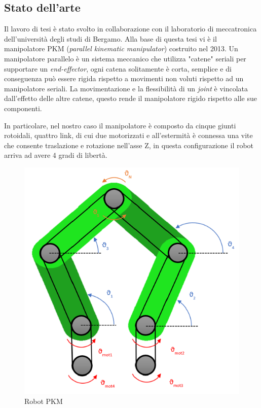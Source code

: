\subsection{Stato dell'arte}
Il lavoro di tesi è stato svolto in collaborazione con il laboratorio di meccatronica dell'università degli studi di Bergamo. Alla base di questa tesi vi è il manipolatore PKM (\textit{parallel kinematic manipulator}) costruito nel 2013. Un manipolatore parallelo è un sistema meccanico che utilizza "catene" seriali per supportare un \textit{end-effector}, ogni catena solitamente è corta, semplice e di conseguenza può essere rigida rispetto a movimenti non voluti rispetto ad un manipolatore seriali. La movimentazione e la flessibilità di un \textit{joint} è vincolata dall'effetto delle altre catene, questo rende il manipolatore rigido rispetto alle sue componenti. 
\par In particolare, nel nostro caso il manipolatore è composto da cinque giunti rotoidali, quattro link, di cui due motorizzati e all'estermità è connessa una vite che consente traslazione e rotazione nell'asse Z, in questa configurazione il robot arriva ad avere 4 gradi di libertà.
\begin{figure}[ht]
	\begin{center}
		\includegraphics[scale=0.7]{Immagini/Robot1.png}
		\caption{Robot PKM 
		\label{fig:PKM}}
	\end{center}
\end{figure}
